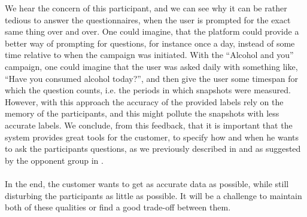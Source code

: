 \begin{quote}
\end{quote}

We hear the concern of this participant, and we can see why it can be rather tedious to answer the questionnaires, when the user is prompted for the exact same thing over and over. One could imagine, that the platform could provide a better way of prompting for questions, for instance once a day, instead of some time relative to when the campaign was initiated. With the ``Alcohol and you'' campaign, one could imagine that the user was asked daily with something like, ``Have you consumed alcohol today?'', and then give the user some timespan for which the question counts, i.e. the periods in which snapshots were measured. However, with this approach the accuracy of the provided labels rely on the memory of the participants, and this might pollute the snapshots with less accurate labels. We conclude, from this feedback, that it is important that the system provides great tools for the customer, to specify how and when he wants to ask the participants questions, as we previously described in  and as suggested by the opponent group in . 
\\\\
In the end, the customer wants to get as accurate data as possible, while still disturbing the participants as little as possible. It will be a challenge to maintain both of these qualities or find a good trade-off between them.